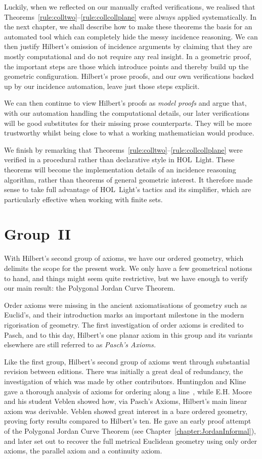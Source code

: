 Luckily, when we reflected on our manually crafted verifications, we realised that Theorems~\ref{rule:colltwo}--\ref{rule:collcollplane} were always applied systematically. In the next chapter, we shall describe how to make these theorems the basis for an automated tool which can completely hide the messy incidence reasoning. We can then justify Hilbert's omission of incidence arguments by claiming that they are mostly computational and do not require any real insight. In a geometric proof, the important steps are those which introduce points and thereby build up the geometric configuration. Hilbert's prose proofs, and our own verifications backed up by our incidence automation, leave just those steps explicit.

We can then continue to view Hilbert's proofs as \emph{model proofs} and argue that, with our automation handling the computational details, our later verifications will be good substitutes for their missing prose counterparts. They will be more trustworthy whilst being close to what a working mathematician would produce.

We finish by remarking that Theorems~\ref{rule:colltwo}--\ref{rule:collcollplane} were verified in a procedural rather than declarative style in HOL~Light. These theorems will become the implementation details of an incidence reasoning algorithm, rather than theorems of general geometric interest. It therefore made sense to take full advantage of HOL~Light's tactics and its simplifier, which are particularly effective when working with finite sets.

\section{Group~II}
With Hilbert's second group of axioms, we have our ordered geometry, which delimits the scope for the present work. We only have a few geometrical notions to hand, and things might seem quite restrictive, but we have enough to verify our main result: the Polygonal Jordan Curve Theorem.

Order axioms were missing in the ancient axiomatisations of geometry such as Euclid's, and their introduction marks an important milestone in the modern rigorisation of geometry. The first investigation of order axioms is credited to Pasch, and to this day, Hilbert's one planar axiom in this group and its variants elsewhere are still referred to as \emph{Pasch's Axioms.}

Like the first group, Hilbert's second group of axioms went through substantial revision between editions. There was initially a great deal of redundancy, the investigation of which was made by other contributors. Huntingdon and Kline gave a thorough analysis of axioms for ordering along a line~\cite{AnalysisBetweenness}, while E.H. Moore and his student Veblen showed how, via Pasch's Axioms, Hilbert's main linear axiom was derivable. Veblen showed great interest in a bare ordered geometry, proving forty results compared to Hilbert's ten. He gave an early proof attempt of the Polygonal Jordan Curve Theorem (see Chapter~\ref{chapter:JordanInformal}), and later set out to recover the full metrical Euclidean geometry using only order axioms, the parallel axiom and a continuity axiom.

